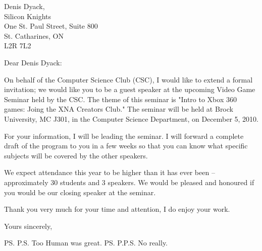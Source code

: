 \documentclass{letter}
\begin{document}
\begin{letter}{
  Denis Dyack,\\
  Silicon Knights\\
  One St. Paul Street, Suite 800\\
  St. Catharines, ON\\
  L2R 7L2\\
}


\opening{Dear Denis Dyack:} %

On behalf of the Computer Science Club (CSC), I would like to extend a formal invitation; 
we would like you to be a guest speaker at the upcoming Video Game Seminar held by the CSC. 
The theme of this seminar is "Intro to Xbox 360 games: Joing the XNA Creators Club."
The seminar will be held at Brock University, MC J301, in the Computer Science Department, on December 5, 2010. 

For your information, I will be leading the seminar.
I will forward a complete draft of the program to you in a few weeks so that you can know what specific subjects
will be covered by the other speakers.

We expect attendance this year to be higher than it has ever been – approximately 30 students and 3 speakers.
We would be pleased and honoured if you would be our closing speaker at the seminar. 

Thank you very much for your time and attention, I do enjoy your work.

\closing{Yours sincerely,}

\ps{P.S. Too Human was great.}
\ps{P.P.S. No really.}



\end{letter}
\end{document}
